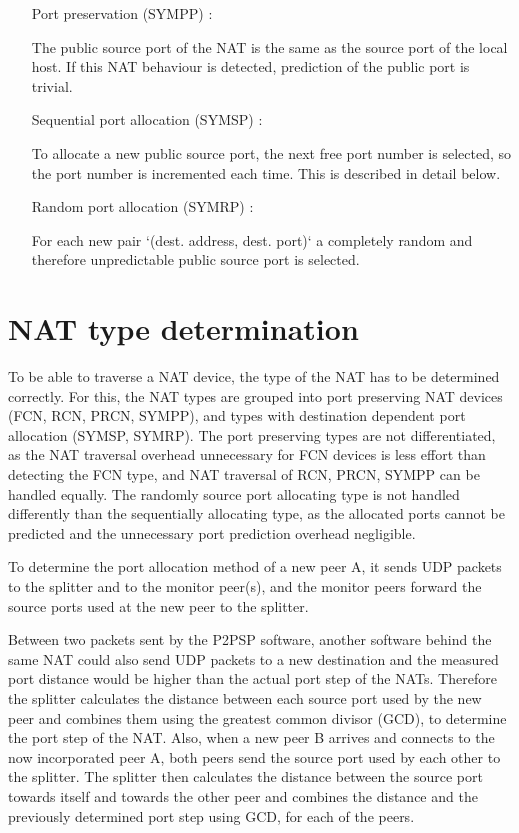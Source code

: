 \documentclass{article}
\begin{document}
\begin{itemize}
\begin{itemize}

\item [Port preservation (SYMPP)]:

The public source port of the NAT is the same as the source port of
the local host. If this NAT behaviour is detected, prediction of the
public port is trivial.

\item [Sequential port allocation (SYMSP)]:

To allocate a new public source port, the next free port number is
selected, so the port number is incremented each time. This is
described in detail below.

\item [Random port allocation (SYMRP)]:

For each new pair `(dest. address, dest. port)` a completely random
and therefore unpredictable public source port is selected.

\end{itemize}

\end{itemize}

\section{NAT type determination}

To be able to traverse a NAT device, the type of the NAT has to be
determined correctly. For this, the NAT types are grouped into port
preserving NAT devices (FCN, RCN, PRCN, SYMPP), and types with
destination dependent port allocation (SYMSP, SYMRP). The port
preserving types are not differentiated, as the NAT traversal overhead
unnecessary for FCN devices is less effort than detecting the FCN
type, and NAT traversal of RCN, PRCN, SYMPP can be handled equally.
The randomly source port allocating type is not handled differently
than the sequentially allocating type, as the allocated ports cannot
be predicted and the unnecessary port prediction overhead negligible.

To determine the port allocation method of a new peer A, it sends UDP
packets to the splitter and to the monitor peer(s), and the monitor
peers forward the source ports used at the new peer to the splitter.

Between two packets sent by the P2PSP software, another software
behind the same NAT could also send UDP packets to a new destination
and the measured port distance would be higher than the actual port
step of the NATs. Therefore the splitter calculates the distance
between each source port used by the new peer and combines them using
the greatest common divisor (GCD), to determine the port step of the
NAT. Also, when a new peer B arrives and connects to the now
incorporated peer A, both peers send the source port used by each
other to the splitter. The splitter then calculates the distance
between the source port towards itself and towards the other peer and
combines the distance and the previously determined port step using
GCD, for each of the peers.
\end{document}
